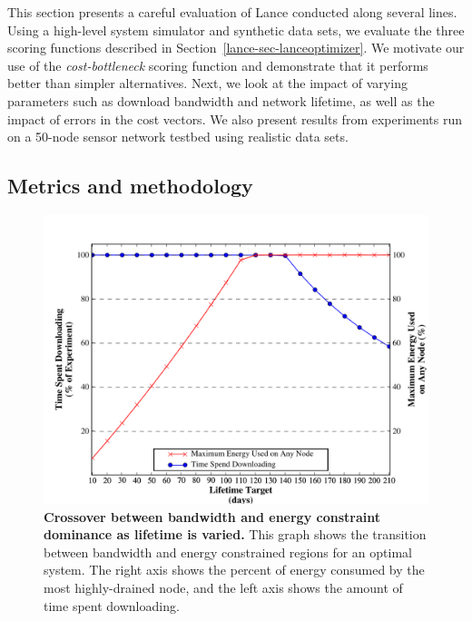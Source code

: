 This section presents a careful evaluation of Lance conducted along several
lines.  Using a high-level system simulator and synthetic data sets, we
evaluate the three scoring functions described in
Section~\ref{lance-sec-lanceoptimizer}. We motivate our use of the
\emph{cost-bottleneck} scoring function and demonstrate that it performs
better than simpler alternatives.  Next, we look at the impact of varying
parameters such as download bandwidth and network lifetime, as well as the
impact of errors in the cost vectors.  We also present results from
experiments run on a 50-node sensor network testbed using realistic data
sets.

\subsection{Metrics and methodology}

\begin{figure}[t]
\label{lance-sec-eval-crossover}
\begin{center}
\includegraphics[width=1.0\hsize]{./4-lance/figs/gwa/crossover/BANDWIDTHVENERGY.pdf}
\end{center}
\caption{\textbf{Crossover between bandwidth and energy constraint dominance
as lifetime is varied.} 
This graph shows the transition between bandwidth and energy constrained
regions for an optimal system.  The right axis shows the percent of energy
consumed by the most highly-drained node, and the left axis shows the amount
of time spent downloading.}
\end{figure}

